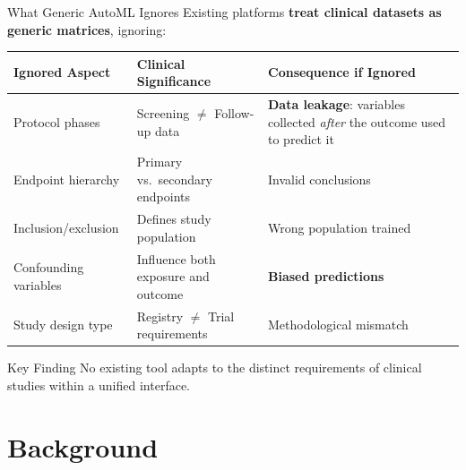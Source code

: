 \documentclass[aspectratio=169,10pt,english,dvipsnames]{beamer}
\begin{document}
\begin{frame}{What Generic AutoML Ignores}
  Existing platforms \textbf{treat clinical datasets as generic matrices}, ignoring:
  \vspace{2mm}
  \begin{table}
    \centering \small
    \renewcommand{\arraystretch}{1.3}
    \begin{tabular}{p{3.0cm} p{4.8cm} p{4.8cm}}
      \toprule
      \textbf{Ignored Aspect} & \textbf{Clinical Significance} & \textbf{Consequence if Ignored} \\
      \midrule
      Protocol phases
        & Screening $\neq$ Follow-up data
        & \textcolor{UCred}{\textbf{Data leakage}}: variables collected \emph{after} the outcome used to predict it \\
      Endpoint hierarchy       & Primary vs.\ secondary endpoints             & Invalid conclusions \\
      Inclusion/exclusion      & Defines study population                      & Wrong population trained \\
      Confounding variables    & Influence both exposure and outcome           & \textcolor{UCred}{\textbf{Biased predictions}} \\
      Study design type        & Registry $\neq$ Trial requirements            & Methodological mismatch \\
      \bottomrule
    \end{tabular}
  \end{table}
  \vspace{2mm}
  \begin{alertblock}{Key Finding}
    No existing tool adapts to the distinct requirements of clinical studies within a unified interface.
  \end{alertblock}
\end{frame}

\section{Background}
\end{document}
